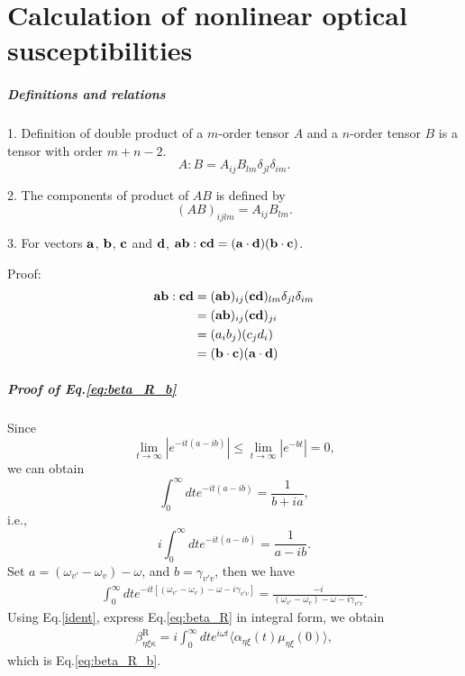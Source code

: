 \chapter{Calculation of nonlinear optical susceptibilities}\label{calculation_of_chi}

\paragraph{Definitions and relations}\label{defs_and_relations}
1. Definition of double product of a $m$-order tensor $A$ and a $n$-order tensor $B$ is a tensor with order $m+n-2$.
\begin{equation}
    A:B=A_{ij}B_{lm}\delta_{jl}\delta_{im}.
\label{tensor_double_product}
\end{equation}

2. The components of product of $AB$ is defined by 
\begin{equation}
    (AB)_{ijlm}=A_{ij}B_{lm}.
\label{tensor_product}
\end{equation}

3. For vectors $\bf{a}$, $\bf{b}$, $\bf{c}$ and $\bf{d}$, ${\bf{ab}}:{\bf{cd}}=({\bf{a}}\cdot {\bf{d}})({\bf{b}}\cdot{\bf{c}})$.

Proof:
\begin{align}
    {\bf{ab}}:{\bf{cd}}&=({\bf{ab}})_{ij}({\bf{cd}})_{lm}\delta_{jl}\delta_{im} \nonumber \\
    &=({\bf{ab}})_{ij}({\bf{cd}})_{ji} \nonumber\\
    &=(a_i b_j)(c_j d_i) \nonumber\\
    &=({\bf{b}}\cdot{\bf{c}})({\bf{a}}\cdot{\bf{d}})
\end{align}

\paragraph{Proof of Eq.\thinspace\ref{eq:beta_R_b}} \label{identities}
Since 
\begin{equation}
  \lim_{t\to\infty} |e^{-it(a-ib)}|\le \lim_{t\to\infty} |e^{-bt}| = 0,\nonumber
  \label{integral_identity0}
\end{equation}
we can obtain
\begin{equation}
  \int_0^\infty dt e^{-it(a-ib)}=\frac{1}{b+ia},\nonumber
  \label{integral_identity0}
\end{equation}
i.e.,
\begin{equation}
  i\int_0^\infty dt e^{-it(a-ib)}=\frac{1}{a-ib}.\nonumber
  \label{integral_identity1}
\end{equation}
Set $a = (\omega_{v'} - \omega_{v}) - \omega$, and $b = \gamma_{v'v}$,
then we have
 \begin{align}
 \int_0^\infty dt e^{-it[(\omega_{v'}-\omega_v)-\omega-i\gamma_{v'v}]}=\frac{-i}{(\omega_{v'} -\omega_v)-\omega-i\gamma_{v'v}}.
 \label{ident}
 \end{align}
 Using Eq.\ref{ident}, express Eq.\ref{eq:beta_R} in integral form, we obtain
 \begin{align}
  \beta_{\eta\xi\kappa}^{\text{R}}=i\int_0^\infty dt e^{i\omega t} \langle\alpha_{\eta\xi}(t)\mu_{\eta\xi}(0)\rangle,\nonumber
 \end{align}
which is Eq.\ref{eq:beta_R_b}.

